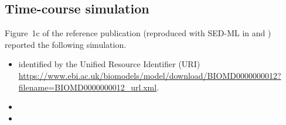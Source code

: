 \subsection{Time-course simulation}
\label{sec:timecourse}
Figure~1c of the reference publication \citep{Elowitz:2000} (reproduced with SED-ML in  and ) reported the following simulation. 

\begin{itemize}
 	\item{ identified by the Unified Resource Identifier (URI) \citep{Berners-Lee:2005}\\ \url{https://www.ebi.ac.uk/biomodels/model/download/BIOMD0000000012?filename=BIOMD0000000012_url.xml}.}
 	\item{}
        \item{}
 \end{itemize}

